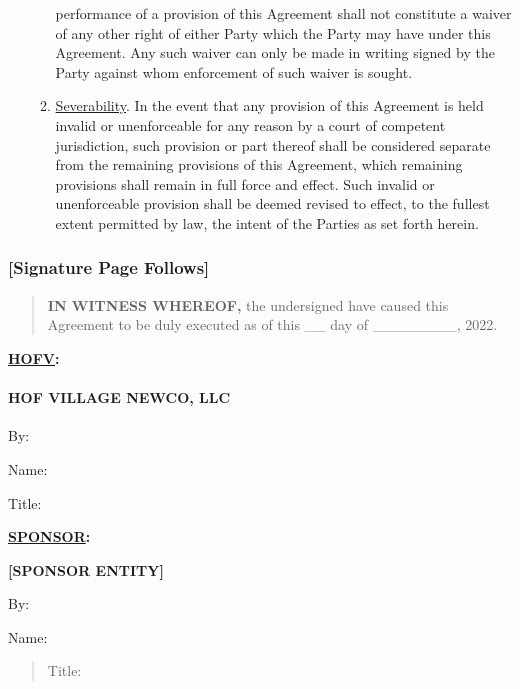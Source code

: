 \documentclass[
]{article}
\begin{document}
\begin{enumerate}
\begin{enumerate}
    performance of a provision of this Agreement shall not constitute a
    waiver of any other right of either Party which the Party may have
    under this Agreement. Any such waiver can only be made in writing
    signed by the Party against whom enforcement of such waiver is
    sought.
  \item
    \uline{Severability}. In the event that any provision of this
    Agreement is held invalid or unenforceable for any reason by a court
    of competent jurisdiction, such provision or part thereof shall be
    considered separate from the remaining provisions of this Agreement,
    which remaining provisions shall remain in full force and effect.
    Such invalid or unenforceable provision shall be deemed revised to
    effect, to the fullest extent permitted by law, the intent of the
    Parties as set forth herein.
  \end{enumerate}
\end{enumerate}

\newpage

\hypertarget{signature-page-follows}{%
\subsubsection{{[}Signature Page
Follows{]}}\label{signature-page-follows}}

\begin{quote}
\textbf{IN WITNESS WHEREOF,} the undersigned have caused this Agreement
to be duly executed as of this \_\_ day of \_\_\_\_\_\_\_\_, 2022.
\end{quote}

\textbf{\uline{HOFV}:}

\hypertarget{hof-village-newco-llc}{%
\paragraph{\texorpdfstring{\textbf{HOF VILLAGE NEWCO, LLC}
}{HOF VILLAGE NEWCO, LLC }}\label{hof-village-newco-llc}}

By:

Name:

Title:

\textbf{\uline{SPONSOR}:}

\textbf{{[}SPONSOR ENTITY{]}}

By:

Name:

\begin{quote}
Title:
\end{quote}
\end{document}
